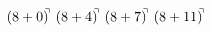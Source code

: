 \documentclass[preview]{standalone}
\begin{document}
\begin{align*}
(8+0)^{\hspace{-0.1cm}\urcorner} \ (8+4)^{\hspace{-0.1cm}\urcorner} \ (8+7)^{\hspace{-0.1cm}\urcorner} \ (8+11)^{\hspace{-0.1cm}\urcorner}
\end{align*}
\end{document}
